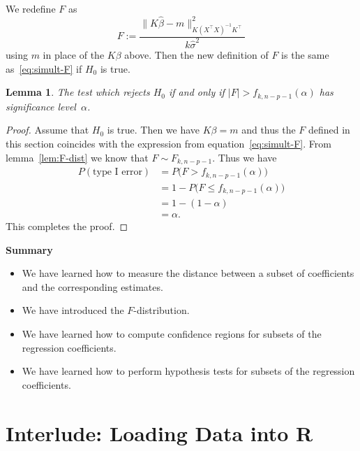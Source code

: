 \documentclass[
  a4paper,
]{article}
\providecommand{\tightlist}{%
  \setlength{\itemsep}{0pt}\setlength{\parskip}{0pt}}
\newtheorem{lemma}{Lemma}[section]
\theoremstyle{definition}
\theoremstyle{definition}
\theoremstyle{definition}
\theoremstyle{definition}
\theoremstyle{remark}
\begin{document}
We redefine \(F\) as
\begin{equation*}
  F
  := \frac{\bigl\| K \hat\beta - m \bigr\|_{K(X^\top X)^{-1} K^\top}^2}
          {k \hat\sigma^2}
\end{equation*}
using \(m\) in place of the \(K\beta\) above. Then the new definition of \(F\)
is the same as~\eqref{eq:simult-F} if \(H_0\) is true.

\begin{lemma}
\protect\hypertarget{lem:simult-test}{}\label{lem:simult-test}The test which rejects \(H_0\) if and only if \(|F| > f_{k,n-p-1}(\alpha)\)
has significance level~\(\alpha\).
\end{lemma}

\begin{proof}
Assume that \(H_0\) is true. Then we have \(K\beta = m\) and thus
the \(F\) defined in this section coincides with the expression from
equation~\eqref{eq:simult-F}. From lemma~\ref{lem:F-dist}
we know that \(F \sim F_{k, n-p-1}\). Thus we have
\begin{align*}
  P( \mbox{type I error} )
  &= P\bigl( F > f_{k,n-p-1}(\alpha) \bigr) \\
  &= 1 - P\bigl( F \leq f_{k,n-p-1}(\alpha) \bigr) \\
  &= 1 - (1 - \alpha) \\
  &= \alpha.
\end{align*}
This completes the proof.
\end{proof}

\textbf{Summary}

\begin{itemize}
\tightlist
\item
  We have learned how to measure the distance between
  a subset of coefficients and the corresponding estimates.
\item
  We have introduced the \(F\)-distribution.
\item
  We have learned how to compute confidence regions for subsets
  of the regression coefficients.
\item
  We have learned how to perform hypothesis tests for subsets
  of the regression coefficients.
\end{itemize}

\clearpage

\section*{Interlude: Loading Data into R}\label{I02-read.csv}
\end{document}
